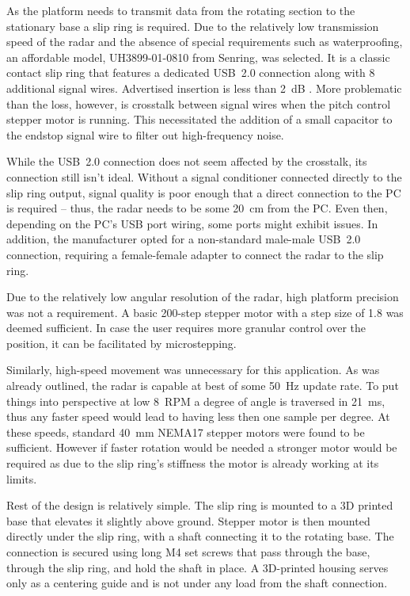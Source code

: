 As the platform needs to transmit data from the rotating section to the stationary base a slip ring is required.
Due to the relatively low transmission speed of the radar and the absence of special requirements such as waterproofing, an affordable model, UH3899-01-0810 from Senring, was selected.
It is a classic contact slip ring that features a dedicated USB~2.0 connection along with 8 additional signal wires.
Advertised insertion is less than 2~dB \cite{slipring}.
More problematic than the loss, however, is crosstalk between signal wires when the pitch control stepper motor is running.
This necessitated the addition of a small capacitor to the endstop signal wire to filter out high-frequency noise.

While the USB~2.0 connection does not seem affected by the crosstalk, its connection still isn't ideal.
Without a signal conditioner connected directly to the slip ring output, signal quality is poor enough that a direct connection to the PC is required -- thus, the radar needs to be some 20~cm from the PC.
Even then, depending on the PC's USB port wiring, some ports might exhibit issues.
In addition, the manufacturer opted for a non-standard male-male USB~2.0 connection, requiring a female-female adapter to connect the radar to the slip ring.

Due to the relatively low angular resolution of the radar, high platform precision was not a requirement.
A basic 200-step stepper motor with a step size of 1.8 was deemed sufficient.
In case the user requires more granular control over the position, it can be facilitated by microstepping.

Similarly, high-speed movement was unnecessary for this application.
As was already outlined, the radar is capable at best of some 50~Hz update rate.
To put things into perspective at low 8~RPM a degree of angle is traversed in 21~ms, thus any faster speed would lead to having less then one sample per degree.
At these speeds, standard 40~mm NEMA17 stepper motors were found to be sufficient.
However if faster rotation would be needed a stronger motor would be required as due to the slip ring's stiffness the motor is already working at its limits.

Rest of the design is relatively simple.
The slip ring is mounted to a 3D printed base that elevates it slightly above ground.
Stepper motor is then mounted directly under the slip ring, with a shaft connecting it to the rotating base.
The connection is secured using long M4 set screws that pass through the base, through the slip ring, and hold the shaft in place.
A 3D-printed housing serves only as a centering guide and is not under any load from the shaft connection.

